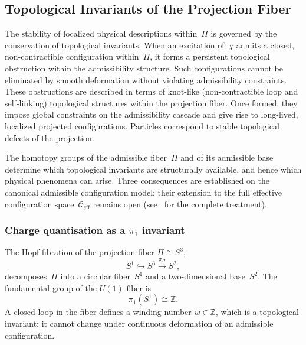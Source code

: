 \subsection{Topological Invariants of the Projection Fiber}
  \label{sec:topological-constraints}

  The stability of localized physical descriptions within~$\Pi$ is governed
  by the conservation of topological invariants.
  When an excitation of~$\chi$ admits a closed, non-contractible
  configuration within~$\Pi$, it forms a persistent topological obstruction within the admissibility structure.
  Such configurations cannot be eliminated by smooth deformation without
  violating admissibility constraints.
  These obstructions are described in terms of knot-like (non-contractible loop and
  self-linking) topological structures within the projection fiber.
  Once formed, they impose global constraints on the admissibility cascade and
  give rise to long-lived, localized projected configurations.
  Particles correspond to stable topological defects of the projection.

  The homotopy groups of the admissible fiber~$\Pi$ and of its admissible
  base determine which topological invariants are structurally available,
  and hence which physical phenomena can arise.
  Three consequences are established on the canonical admissible configuration model;
  their extension to the full effective configuration space~$\mathcal{C}_{\mathrm{eff}}$
  remains open (see~\cite{Beau2026k} for the complete treatment).

  \subsubsection*{Charge quantisation as a $\pi_1$ invariant}
    \label{sec:charge-quantisation-pi1}

    The Hopf fibration of the projection fiber $\Pi \cong S^3$,
    \begin{equation}
      S^1 \hookrightarrow S^3 \xrightarrow{\pi_H} S^2,
    \end{equation}
    decomposes~$\Pi$ into a circular fiber~$S^1$ and a two-dimensional base~$S^2$.
    The fundamental group of the $U(1)$ fiber is
    \begin{equation}
      \pi_1(S^1) \cong \mathbb{Z}.
    \end{equation}
    A closed loop in the fiber defines a winding number $w \in \mathbb{Z}$,
    which is a topological invariant: it cannot change under continuous deformation
    of an admissible configuration.

